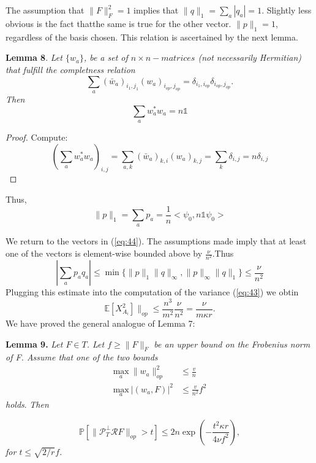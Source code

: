 \documentclass{article}
\begin{document}
The assumption that $\|F\|_F^2 = 1$ implies that $\|q\|_1 = \sum_a|q_a| = 1$. Slightly less obvious is the fact thatthe same is true for the other vector. $\|p\|_1 = 1$, regardless of the basis chosen. This relation is ascertained by the next lemma.

\textbf{Lemma 8}. \textit{Let $\lbrace w_a \rbrace$, be a set of $n \times n-matrices$ (not necessarily Hermitian) that fulfill the completness relation}
\begin{equation}
\sum_a(\bar{w}_a)_{i_1,j_1}(w_a)_{i_{op},j_{op}} = \delta_{i_1,i_{op}}\delta_{i_{op},j_{op}}.
\end{equation}
\textit{Then}
\[
\sum_a w_a^* w_a = n\mathbb{1}
\]

\begin{proof}
Compute:
\[
\left(\sum_a w_a^* w_a\right)_{i,j} = \sum_{a,k}(\bar{w}_a)_{k,i}(w_a)_{k,j} = \sum_k \delta_{i,j} = n\delta_{i,j}
\]
\end{proof}

Thus,
\[
\|p\|_1 = \sum_ap_a = \frac{1}{n}<\psi_0,n\mathbb{1}\psi_0>
\]

We return to the vectors in (\ref{eq:44}). The assumptions made imply that at least one of the vectors is element-wise bounded above by $\frac{\nu}{n^2}$.Thus
\begin{equation}
\left|\sum_ap_aq_a\right| \le \min\lbrace \|p\|_1 \|q\|_\infty,\|p\|_\infty \|q\|_1 \rbrace \le \frac{\nu}{n^2}
\end{equation}
Plugging this estimate into the computation of the variance (\ref{eq:43}) we obtin
\[
\mathbb{E}[X_{A_i}^2]\|_{op} \le \frac{n^3}{m^2}\frac{\nu}{n^2} = \frac{\nu}{m\kappa r}.
\]
We have proved the general analogue of Lemma 7:

\textbf{Lemma 9.} \textit{Let $F \in T$. Let $f\ge \|F\|_F$ be an upper bound on the Frobenius norm of F. Assume that one of the two bounds}
\begin{align}
\underset{a} {\mathrm{max}} ~\|w_a\|_{op}^2 & \le \frac{v}{n}\\
\underset{a} {\mathrm{max}} ~|(w_a,F)|^2 & \le \frac{v}{n^2}f^2
\end{align}
\textit{holds}. \textit{Then}

\begin{equation}
\mathbb{P} \left[  \|\mathcal{P}_T^\perp\mathcal{R}F\|_{op} >t    \right] \le 2n \exp\left(-\frac{t^2\kappa r}{4\nu f^2} \right),
\end{equation}
\textit{for $t\le \sqrt{2/r}f$.}
\end{document}
